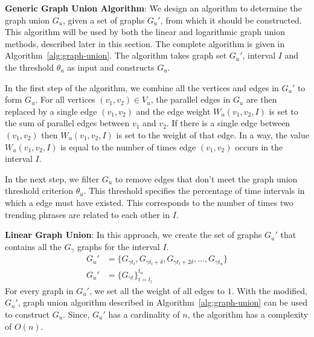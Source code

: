 \documentclass{sig-alternate}
\newtheorem{lemma}{Lemma}[section]
\begin{document}
\medskip\noindent\textbf{Generic Graph Union Algorithm}: We design an algorithm to determine the graph union $G_u$, given a set of graphs $G_u'$, from which it should be constructed. This algorithm will be used by both the linear and logarithmic graph union methods, described later in this section. The complete algorithm is given in Algorithm~\ref{alg:graph-union}. The algorithm takes graph set $G_u'$, interval $I$ and the threshold $\theta_u$ as input and constructs $G_u$.

In the first step of the algorithm, we combine all the vertices and edges in $G_u'$ to form $G_u$. For all vertices $(v_1, v_2) \in V_u$, the parallel edges in $G_u$ are then replaced by a single edge $(v_1, v_2)$ and the edge weight $ W_u(v_1, v_2, I)$ is set to the sum of parallel edges between $v_1$ and $v_2$. If there is a single edge between $(v_1, v_2)$ then $ W_u(v_1, v_2, I)$ is set to the weight of that edge. In a way, the value $ W_u(v_1, v_2, I)$ is equal to the number of times edge $(v_1, v_2)$ occurs in the interval $I$.

In the next step, we filter $G_u$ to remove edges that don't meet the graph union threshold criterion $\theta_u$. This threshold specifies the percentage of time intervals in which a edge must have existed. This corresponds to the number of times two trending phrases are related to each other in $I$. 


\medskip\noindent\textbf{Linear Graph Union}: In this approach, we create the set of graphs $G_u'$ that contains all the $G_\gamma$ graphs for the interval $I$.  
\begin{align*}
G_u' &= \{G_{\gamma t_l}, G_{\gamma t_{l}+\delta}, G_{\gamma t_{l}+2\delta} , \dots , G_{\gamma t_{u}} \}\\
G_u' &= \{G_{\gamma t}\}_{t=t_l}^{t_u}
\end{align*} 
For every graph in $G_u'$, we set all the weight of all edges to $1$. With the modified, $G_u'$, graph union algorithm described in Algorithm~\ref{alg:graph-union} can be used to construct $G_u$. Since, $G_u'$ has a cardinality of $n$, the algorithm has a complexity of $O(n)$.
\end{document}
